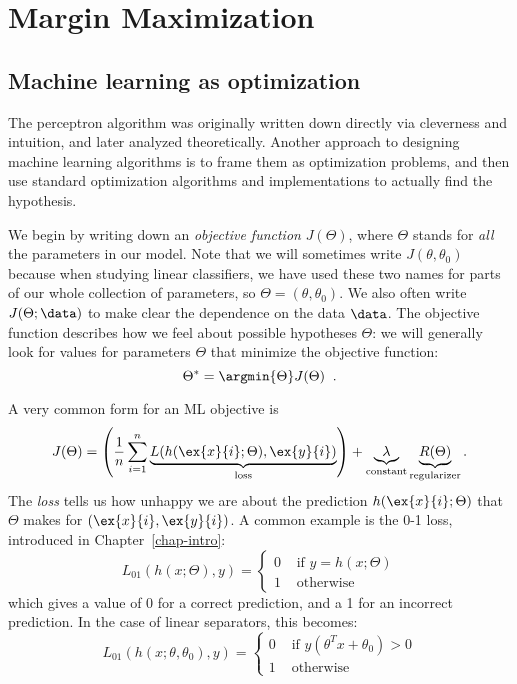 \chapter{Margin Maximization}
\label{chap-margin}

\section{Machine learning as optimization}
The perceptron algorithm was originally written down directly via
cleverness and intuition, and later analyzed theoretically. Another
approach to designing machine learning algorithms is to frame them as
optimization problems, and then use standard optimization algorithms
and implementations to actually find the hypothesis.

We begin by writing down an \emph{objective function} $J(\Theta)$,
where $\Theta$ stands for {\em all} the parameters in our model.
Note that we will sometimes write $J(\theta, \theta_0)$
because when studying linear classifiers, we have used these two
names for parts of our whole collection of parameters, so $\Theta =
(\theta, \theta_0)$.
We also often write $J(\Theta; \data)$ to make clear the dependence on
the data $\data$.  The objective
function describes how we feel about
possible hypotheses $\Theta$: we will generally look for values for
parameters $\Theta$ that minimize the objective function:
\[ \Theta^* = \argmin{\Theta} J(\Theta)\;\;. \]

A very common form for an ML objective is
\[
  J(\Theta) = \left(\frac{1}{n} \sum_{i=1}^n
    \underbrace{L(h(\ex{x}{i}; \Theta), 
  \ex{y}{i})}_\text{loss}\right) + \underbrace{\lambda}
  _\text{constant} \underbrace{R(\Theta)}_\text{regularizer}.
\]
The \emph{loss} tells us how unhappy we are about the prediction
$h(\ex{x}{i}; \Theta)$ that
$\Theta$ makes for $(\ex{x}{i}, \ex{y}{i})$. A common example
is the 0-1 loss, introduced in Chapter~\ref{chap-intro}:
\[ L_{01}(h(x; \Theta), y) =
  \begin{cases}
    0 & \text{ if } y = h(x; \Theta)\\
    1 & \text{ otherwise}
  \end{cases}
\]
which gives a value of 0 for a correct prediction, and a 1 for an
incorrect prediction.  In the case of linear separators, this becomes:
\[ L_{01}(h(x;\theta, \theta_0), y) =
  \begin{cases}
    0 & \text{ if } y(\theta^Tx + \theta_0) > 0 \\
    1 & \text{ otherwise}
  \end{cases}
\]


